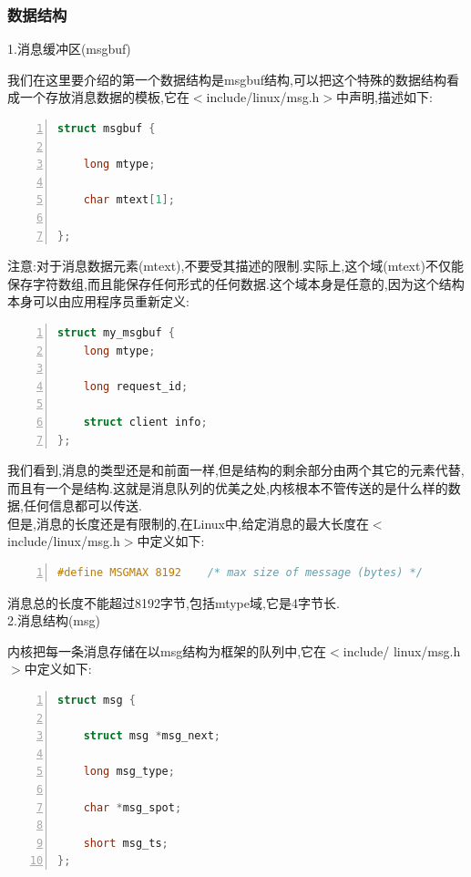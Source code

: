 \documentclass[a4paper,12pt,notitlepage]{article}
\begin{document}
\subsubsection{数据结构}

1.消息缓冲区(msgbuf)

我们在这里要介绍的第一个数据结构是msgbuf结构,可以把这个特殊的数据结构看成一个存放消息数据的模板,它在$<$include/linux/msg.h$>$中声明,描述如下:

\begin{lstlisting}[frame=shadowbox,numbers=left,language=C]
struct msgbuf {

    long mtype;

    char mtext[1];   

};
\end{lstlisting}

	注意:对于消息数据元素(mtext),不要受其描述的限制.实际上,这个域(mtext)不仅能保存字符数组,而且能保存任何形式的任何数据.这个域本身是任意的,因为这个结构本身可以由应用程序员重新定义:

\begin{lstlisting}[frame=shadowbox,numbers=left,language=C]
struct my_msgbuf {
	long mtype;        

	long request_id;  

	struct client info;  
};
\end{lstlisting}

	我们看到,消息的类型还是和前面一样,但是结构的剩余部分由两个其它的元素代替,而且有一个是结构.这就是消息队列的优美之处,内核根本不管传送的是什么样的数据,任何信息都可以传送.\\

	但是,消息的长度还是有限制的,在Linux中,给定消息的最大长度在$<$include/linux/msg.h$>$中定义如下:

\begin{lstlisting}[frame=shadowbox,numbers=left,language=C]
#define MSGMAX 8192    /* max size of message (bytes) */
\end{lstlisting}

	消息总的长度不能超过8192字节,包括mtype域,它是4字节长.\\

2.消息结构(msg)

	内核把每一条消息存储在以msg结构为框架的队列中,它在$<$include/ linux/msg.h$>$中定义如下:

\begin{lstlisting}[frame=shadowbox,numbers=left,language=C]
struct msg {

    struct msg *msg_next;   

    long msg_type;          
    
    char *msg_spot; 

    short msg_ts;
};
\end{lstlisting}
\end{document}

